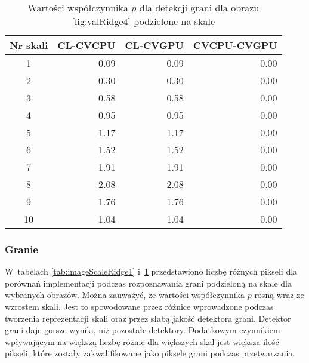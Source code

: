 \begin{center}
\begin{table}
\centering
\caption{Wartości współczynnika $ p $ dla detekcji grani dla obrazu \ref{fig:valRidge4} podzielone na skale}
\label{tab:imageScaleRidge4}
\begin{tabular}{|c|r|r|r|}
 \hline
Nr skali & CL-CVCPU & CL-CVGPU & CVCPU-CVGPU \\ \hline
1        & 0.09     & 0.09     & 0.00        \\ \hline
2        & 0.30     & 0.30     & 0.00        \\ \hline
3        & 0.58     & 0.58     & 0.00        \\ \hline
4        & 0.95     & 0.95     & 0.00        \\ \hline
5        & 1.17     & 1.17     & 0.00        \\ \hline
6        & 1.52     & 1.52     & 0.00        \\ \hline
7        & 1.91     & 1.91     & 0.00        \\ \hline
8        & 2.08     & 2.08     & 0.00        \\ \hline
9        & 1.76     & 1.76     & 0.00        \\ \hline
10       & 1.04     & 1.04     & 0.00        \\ \hline
\end{tabular}
\end{table}
\end{center}

\subsubsection{Granie}
\label{subsubsec:granieTabele}

W~tabelach \ref{tab:imageScaleRidge1} i~\ref{tab:imageScaleRidge4} przedstawiono liczbę różnych pikseli dla porównań implementacji podczas rozpoznawania grani podzieloną na skale dla wybranych obrazów. Można zauważyć, że wartości współczynnika $ p $ rosną wraz ze wzrostem skali. Jest to spowodowane przez różnice wprowadzone podczas tworzenia reprezentacji skali oraz przez słabą jakość detektora grani. Detektor grani daje gorsze wyniki, niż pozostałe detektory. Dodatkowym czynnikiem wpływającym na większą liczbę różnic dla większych skal jest większa ilość pikseli, które zostały zakwalifikowane jako piksele grani podczas przetwarzania.
